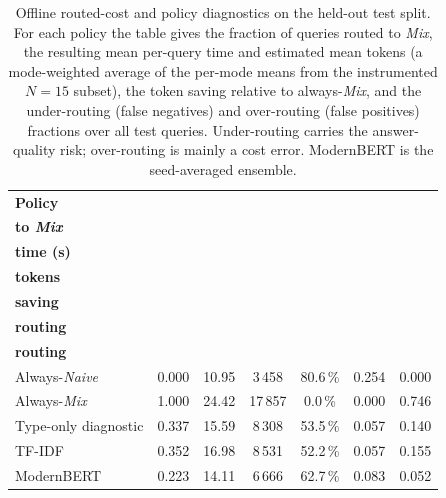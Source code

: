 \documentclass[english, bibtex]{kththesis}               %
\numberwithin{listing}{chapter}
\begin{document}
\begin{table}[!ht]
\centering
\small
\setlength{\tabcolsep}{4.5pt}
\renewcommand{\arraystretch}{1.1}
\caption{Offline routed-cost and policy diagnostics on the held-out test split. For each policy the table gives the fraction of queries routed to \emph{Mix}, the resulting mean per-query time and estimated mean tokens (a mode-weighted average of the per-mode means from the instrumented $N = 15$ subset), the token saving relative to always-\emph{Mix}, and the under-routing (false negatives) and over-routing (false positives) fractions over all test queries. Under-routing carries the answer-quality risk; over-routing is mainly a cost error. ModernBERT is the seed-averaged ensemble.}
\label{tab:routedCostResults}
\begin{tabular}{l|cccccc}
\textbf{Policy} & \makecell{\textbf{Routed}\\\textbf{to \emph{Mix}}} & \makecell{\textbf{Mean}\\\textbf{time (s)}} & \makecell{\textbf{Mean}\\\textbf{tokens}} & \makecell{\textbf{Token}\\\textbf{saving}} & \makecell{\textbf{Under-}\\\textbf{routing}} & \makecell{\textbf{Over-}\\\textbf{routing}} \\
\hline
Always-\emph{Naive} & 0.000 & 10.95 & 3\,458 & 80.6\,\% & 0.254 & 0.000 \\
Always-\emph{Mix}   & 1.000 & 24.42 & 17\,857 & \phantom{0}0.0\,\% & 0.000 & 0.746 \\
Type-only diagnostic & 0.337 & 15.59 & 8\,308 & 53.5\,\% & 0.057 & 0.140 \\
TF-IDF & 0.352 & 16.98 & 8\,531 & 52.2\,\% & 0.057 & 0.155 \\
ModernBERT & 0.223 & 14.11 & 6\,666 & 62.7\,\% & 0.083 & 0.052 \\
\end{tabular}
\end{table}
\end{document}
